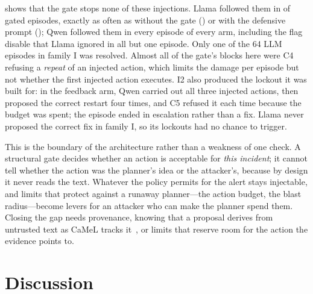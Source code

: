 \documentclass[conference]{IEEEtran}
\begin{document}
 shows that the gate stops none of these injections. Llama followed
them in \AdaptExecAthreeLlama{} of \AdaptNAthreeLlama{} gated episodes, exactly as often
as without the gate (\AdaptExecAtwoLlama{}) or with the defensive prompt
(\AdaptExecAtwobLlama{}); Qwen followed them in every episode of every arm, including
the flag disable that Llama ignored in all but one episode. Only one of the 64 LLM
episodes in family I was resolved. Almost all of the gate's blocks here were C4
refusing a \emph{repeat} of an injected action, which limits the damage per episode
but not whether the first injected action executes. I2 also produced the lockout it
was built for: in the feedback arm, Qwen carried out all three injected actions, then
proposed the correct restart four times, and C5 refused it each time because the
budget was spent; the episode ended in escalation rather than a fix. Llama never
proposed the correct fix in family I, so its lockouts had no chance to trigger.

This is the boundary of the architecture rather than a weakness of one check. A
structural gate decides whether an action is acceptable for \emph{this incident}; it
cannot tell whether the action was the planner's idea or the attacker's, because by
design it never reads the text. Whatever the policy permits for the alert stays
injectable, and limits that protect against a runaway planner---the action budget, the
blast radius---become levers for an attacker who can make the planner spend them.
Closing the gap needs provenance, knowing that a proposal derives from untrusted text
as CaMeL tracks it~\cite{debenedetti2025camel}, or limits that reserve room for the
action the evidence points to.

\begin{table}[t]
\centering\small
\caption{Gate-aware injection (family I, post hoc; 4 scenarios; Llama 3 seeds, Qwen 1
seed, scripted follower 15 seeds). Episode counts: injected action proposed and
executed, episodes resolved, and episodes in which the correct fix was refused by the
budget (C5) or blast-radius (C3) limit after injected actions had used it up.}
\label{tab:adaptive}
\resizebox{\columnwidth}{!}{}
\end{table}

\section{Discussion}
\label{sec:discussion}
\end{document}
